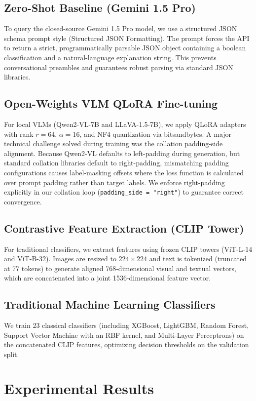 \documentclass[11pt]{article}
\begin{document}
\subsection{Zero-Shot Baseline (Gemini 1.5 Pro)}
To query the closed-source Gemini 1.5 Pro model, we use a structured JSON schema prompt style (Structured JSON Formatting). The prompt forces the API to return a strict, programmatically parsable JSON object containing a boolean classification and a natural-language explanation string. This prevents conversational preambles and guarantees robust parsing via standard JSON libraries.

\subsection{Open-Weights VLM QLoRA Fine-tuning}
For local VLMs (Qwen2-VL-7B and LLaVA-1.5-7B), we apply QLoRA adapters with rank $r=64$, $\alpha=16$, and NF4 quantization via bitsandbytes. A major technical challenge solved during training was the collation padding-side alignment. Because Qwen2-VL defaults to left-padding during generation, but standard collation libraries default to right-padding, mismatching padding configurations causes label-masking offsets where the loss function is calculated over prompt padding rather than target labels. We enforce right-padding explicitly in our collation loop (\texttt{padding\_side = "right"}) to guarantee correct convergence.

\subsection{Contrastive Feature Extraction (CLIP Tower)}
For traditional classifiers, we extract features using frozen CLIP towers (ViT-L-14 and ViT-B-32). Images are resized to $224 \times 224$ and text is tokenized (truncated at 77 tokens) to generate aligned 768-dimensional visual and textual vectors, which are concatenated into a joint 1536-dimensional feature vector.

\subsection{Traditional Machine Learning Classifiers}
We train 23 classical classifiers (including XGBoost, LightGBM, Random Forest, Support Vector Machine with an RBF kernel, and Multi-Layer Perceptrons) on the concatenated CLIP features, optimizing decision thresholds on the validation split.

\section{Experimental Results}
\label{sec:results}
\end{document}
